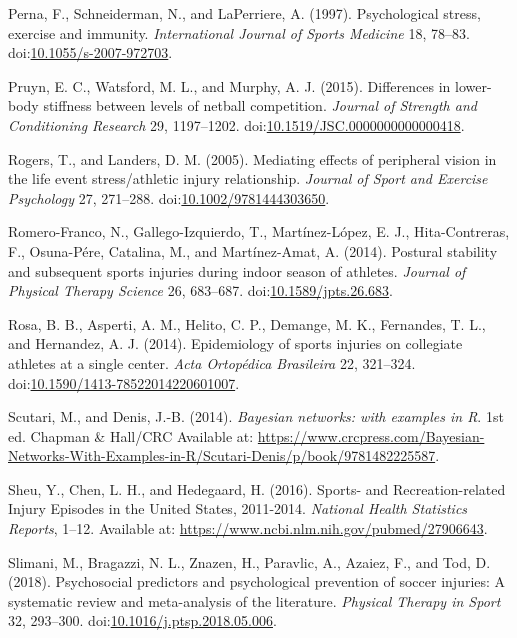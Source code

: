 \documentclass[utf8]{frontiersHLTH}
\begin{document}
\leavevmode\hypertarget{ref-Perna1997}{}%
Perna, F., Schneiderman, N., and LaPerriere, A. (1997). Psychological
stress, exercise and immunity. \emph{International Journal of Sports
Medicine} 18, 78--83.
doi:\href{https://doi.org/10.1055/s-2007-972703}{10.1055/s-2007-972703}.

\leavevmode\hypertarget{ref-Pruyn2015}{}%
Pruyn, E. C., Watsford, M. L., and Murphy, A. J. (2015). Differences in
lower-body stiffness between levels of netball competition.
\emph{Journal of Strength and Conditioning Research} 29, 1197--1202.
doi:\href{https://doi.org/10.1519/JSC.0000000000000418}{10.1519/JSC.0000000000000418}.

\leavevmode\hypertarget{ref-Rogers2005}{}%
Rogers, T., and Landers, D. M. (2005). Mediating effects of peripheral
vision in the life event stress/athletic injury relationship.
\emph{Journal of Sport and Exercise Psychology} 27, 271--288.
doi:\href{https://doi.org/10.1002/9781444303650}{10.1002/9781444303650}.

\leavevmode\hypertarget{ref-Romero-Franco2014}{}%
Romero-Franco, N., Gallego-Izquierdo, T., Martínez-López, E. J.,
Hita-Contreras, F., Osuna-Pére, Catalina, M., and Martínez-Amat, A.
(2014). Postural stability and subsequent sports injuries during indoor
season of athletes. \emph{Journal of Physical Therapy Science} 26,
683--687.
doi:\href{https://doi.org/10.1589/jpts.26.683}{10.1589/jpts.26.683}.

\leavevmode\hypertarget{ref-Rosa2014}{}%
Rosa, B. B., Asperti, A. M., Helito, C. P., Demange, M. K., Fernandes,
T. L., and Hernandez, A. J. (2014). Epidemiology of sports injuries on
collegiate athletes at a single center. \emph{Acta Ortopédica
Brasileira} 22, 321--324.
doi:\href{https://doi.org/10.1590/1413-78522014220601007}{10.1590/1413-78522014220601007}.

\leavevmode\hypertarget{ref-Scutari2014}{}%
Scutari, M., and Denis, J.-B. (2014). \emph{Bayesian networks: with
examples in R}. 1st ed. Chapman \& Hall/CRC Available at:
\url{https://www.crcpress.com/Bayesian-Networks-With-Examples-in-R/Scutari-Denis/p/book/9781482225587}.

\leavevmode\hypertarget{ref-Sheu2016}{}%
Sheu, Y., Chen, L. H., and Hedegaard, H. (2016). Sports- and
Recreation-related Injury Episodes in the United States, 2011-2014.
\emph{National Health Statistics Reports}, 1--12. Available at:
\url{https://www.ncbi.nlm.nih.gov/pubmed/27906643}.

\leavevmode\hypertarget{ref-Slimani2018}{}%
Slimani, M., Bragazzi, N. L., Znazen, H., Paravlic, A., Azaiez, F., and
Tod, D. (2018). Psychosocial predictors and psychological prevention of
soccer injuries: A systematic review and meta-analysis of the
literature. \emph{Physical Therapy in Sport} 32, 293--300.
doi:\href{https://doi.org/10.1016/j.ptsp.2018.05.006}{10.1016/j.ptsp.2018.05.006}.
\end{document}
